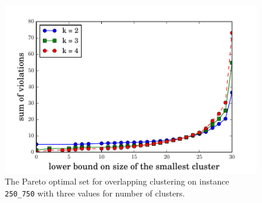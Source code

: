 \documentclass[conference]{IEEEtran}
\begin{document}
\begin{figure}
\centering
\includegraphics[scale=0.5]{images/pareto}
\captionsetup{font=small}
\caption{The Pareto optimal set for overlapping clustering on instance \texttt{250\_750} with three values for number of clusters.}
\label{fig:pareto}
\end{figure}
\end{document}
